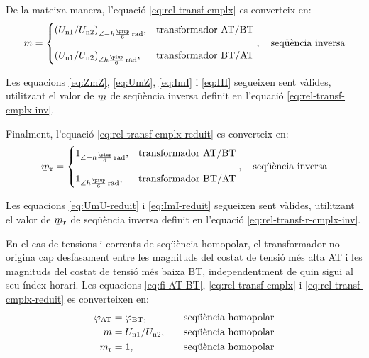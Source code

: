 De la mateixa manera, l'equació \eqref{eq:rel-transf-cmplx} es converteix en:
\begin{equation}\label{eq:rel-transf-cmplx-inv}
\cmplx{m} = \begin{cases}
     (U\ped{n1}/U\ped{n2})_{\angle -h \frac{\piup}{6}\unit{\,rad}}, & \text{transformador AT/BT}\\[2.7ex]
     (U\ped{n1}/U\ped{n2})_{\angle h \frac{\piup}{6}\unit{\,rad}}, & \text{transformador BT/AT}
\end{cases},
\quad\text{seqüència inversa}
\end{equation}

Les equacions \eqref{eq:ZmZ}, \eqref{eq:UmZ}, \eqref{eq:ImI} i \eqref{eq:III} segueixen sent vàlides, utilitzant el valor de $\cmplx{m}$ de seqüència inversa definit en l'equació \eqref{eq:rel-transf-cmplx-inv}.

Finalment, l'equació \eqref{eq:rel-transf-cmplx-reduit} es converteix en:
\begin{equation}\label{eq:rel-transf-r-cmplx-inv}
\cmplx{m}\ped{r}  = \begin{cases}
      1_{\angle -h\frac{\piup}{6}\unit{\,rad}}, & \text{transformador AT/BT}\\[2.7ex]
      1_{\angle h\frac{\piup}{6}\unit{\,rad}}, & \text{transformador BT/AT}
\end{cases},
\quad\text{seqüència inversa}
\end{equation}

Les equacions \eqref{eq:UmU-reduit} i \eqref{eq:ImI-reduit} segueixen sent vàlides, utilitzant el valor de $\cmplx{m}\ped{r}$ de seqüència inversa definit en l'equació \eqref{eq:rel-transf-r-cmplx-inv}.

En el cas de tensions i corrents de seqüència homopolar, el transformador no  origina cap desfasament entre les magnituds  del costat de tensió més alta AT i les magnituds del costat de tensió més baixa BT, independentment de quin sigui al seu índex horari. Les equacions \eqref{eq:fi-AT-BT}, \eqref{eq:rel-transf-cmplx} i \eqref{eq:rel-transf-cmplx-reduit} es converteixen en:
\begin{alignat}{3}
  \varphi_\mathrm{AT} &= \varphi_\mathrm{BT}, &&\quad\text{seqüència homopolar} \\
  m &= U_\mathrm{n1}/U_\mathrm{n2}, &&\quad\text{seqüència homopolar}\label{eq:rel-transf-cmplx-hom} \\
  m_\mathrm{r} &= 1, &&\quad\text{seqüència homopolar}
\end{alignat}

